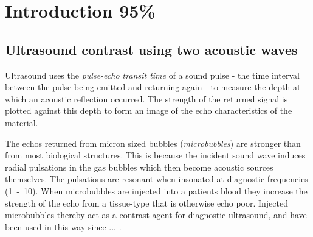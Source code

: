 




\chapter{Introduction 95\%}\label{ch:introduction}
\section{Ultrasound contrast using two acoustic waves}\label{sec:int:Introduction}

 

 

Ultrasound uses the {\em pulse-echo transit time} of a sound pulse -
the time interval between the pulse being emitted and returning again -
to measure the depth at which an acoustic reflection occurred.
The strength of the returned signal is plotted
against this depth to form an image of the echo characteristics of the material.



The echos returned from micron sized bubbles ({\em microbubbles}) are stronger than from most biological structures.
This is because the incident sound wave induces radial pulsations in the gas bubbles
which then become acoustic sources themselves.
The pulsations are resonant when insonated at diagnostic frequencies (\unit{1-10}\mega\hertz).
When microbubbles are injected into a patients blood
they increase the strength of the echo
from a tissue-type that is otherwise echo poor.
Injected microbubbles thereby act as a contrast agent for diagnostic ultrasound,
and have been used in this way since ... \cite{}.


